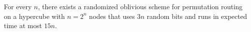 \begin{theorem}
    For every $n$, there exists a randomized oblivious scheme for
    permutation routing on a hypercube with $n=2^n$ nodes that uses
    $3n$ random bits and runs in expected time at most $15n$.
\end{theorem}




% 



\ChapterEnd{}

